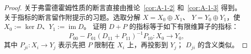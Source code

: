 \begin{proof}
关于弗雷德霍姆性质的断言直接由推论~\ref{cor:A-1-2} 和~\ref{cor:A-1-3} 得到。
关于指标的断言留作附提示的习题。选取分解 $X=X_0\oplus X_1$、
$Y=Y_0\oplus Y_1$，使 $X_0:=\ker D$、$Y_1:=\operatorname{im}D$。
证明 $D+P$ 的指标等于如下有限维算子的指标：
\[
  P_{00}-P_{01}(D_{11}+P_{11})^{-1}P_{10}:X_0\longrightarrow Y_0,
\]
其中 $P_{ji}:X_i\to Y_j$ 表示先把 $P$ 限制在 $X_i$ 上，再投影到 $Y_j$；
$D_{ji}$ 的含义类似。
\end{proof}
